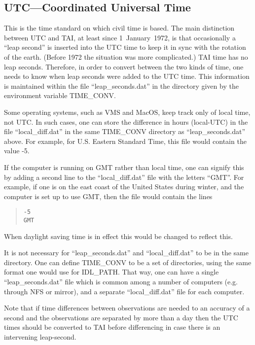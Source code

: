 \subsection{UTC---Coordinated Universal Time}

This is the time standard on which civil time is based.  The main distinction
between UTC and TAI, at least since 1~January~1972, is that occasionally a
``leap second'' is inserted into the UTC time to keep it in sync with the
rotation of the earth.  (Before 1972 the situation was more complicated.)  TAI
time has no leap seconds.  Therefore, in order to convert between the two kinds
of time, one needs to know when leap seconds were added to the UTC time.  This
information is maintained within the file ``leap\_seconds.dat'' in the
directory given by the environment variable TIME\_CONV.

Some operating systems, such as VMS and MacOS, keep track only of local
time, not UTC.  In such cases, one can store the difference in hours
(local-UTC) in the file ``local\_diff.dat'' in the same TIME\_CONV directory
as ``leap\_seconds.dat'' above.  For example, for U.S. Eastern Standard Time,
this file would contain the value -5.

If the computer is running on GMT rather than local time, one can signify this
by adding a second line to the ``local\_diff.dat'' file with the letters
``GMT''.  For example, if one is on the east coast of the United States during
winter, and the computer is set up to use GMT, then the file would contain the
lines
\begin{quote}
\begin{verbatim}
-5
GMT
\end{verbatim}
\end{quote}
When daylight saving time is in effect this would be changed to reflect this.

It is not necessary for ``leap\_seconds.dat'' and ``local\_diff.dat'' to be in
the same directory.  One can define TIME\_CONV to be a set of directories,
using the same format one would use for IDL\_PATH.  That way, one can have a
single ``leap\_seconds.dat'' file which is common among a number of computers
(e.g. through NFS or mirror), and a separate ``local\_diff.dat'' file for each
computer.

Note that if time differences between observations are needed to an accuracy of
a second and the observations are separated by more than a day then the UTC
times should be converted to TAI before differencing in case there is an
intervening leap-second.

